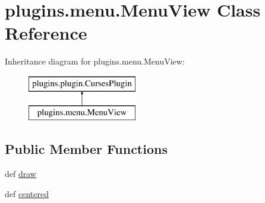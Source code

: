 \hypertarget{classplugins_1_1menu_1_1_menu_view}{\section{plugins.\-menu.\-Menu\-View \-Class \-Reference}
\label{classplugins_1_1menu_1_1_menu_view}
}
\-Inheritance diagram for plugins.\-menu.\-Menu\-View\-:\begin{figure}[H]
\begin{center}
\leavevmode
\includegraphics[height=2.000000cm]{classplugins_1_1menu_1_1_menu_view}
\end{center}
\end{figure}
\subsection*{\-Public \-Member \-Functions}
\begin{DoxyCompactItemize}
\item 
def \hyperlink{classplugins_1_1menu_1_1_menu_view_a693bc4021b2a04bd22ceb15dde01a330}{draw}
\item 
def \hyperlink{classplugins_1_1menu_1_1_menu_view_a259e6ac87d88f5d1ce17770ac46f5865}{centered}
\end{DoxyCompactItemize}
